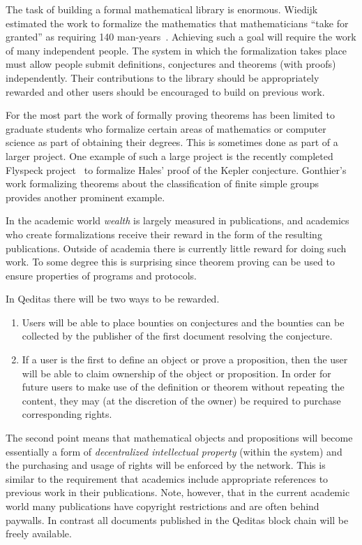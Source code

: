 \documentclass{article}
\begin{document}
The task of building a formal mathematical library is enormous.
Wiedijk estimated the work to formalize the mathematics that mathematicians
``take for granted'' as requiring 140 man-years~\cite{WiedijkEstimating}.
Achieving such a goal will require the work of many independent people.
The system in which the formalization takes place must allow people
submit definitions, conjectures and theorems (with proofs)
independently. Their contributions to the library should be appropriately
rewarded and other users should be encouraged to build on previous work.

For the most part the work of formally proving theorems
has been limited to
graduate students who formalize certain areas of mathematics or computer science
as part of obtaining their degrees.
This is sometimes done as part of a larger project.
One example of such a large project is the recently completed Flyspeck project~\cite{Flyspeck2015}
to formalize Hales' proof of the Kepler conjecture.
Gonthier's work formalizing
theorems about the classification of finite simple groups~\cite{Gonthier2013}
provides another prominent example.

In the academic world {\em{wealth}} is largely measured in publications,
and academics who create formalizations
receive their reward in the form of the resulting publications.
Outside of academia there is currently little reward for doing such work.
To some degree this is surprising since theorem proving can
be used to ensure properties of programs and protocols.

In Qeditas there will be two ways to be rewarded.
\begin{enumerate}
\item Users will be able to place bounties on conjectures
and the bounties can be collected by the publisher
of the first document resolving the conjecture.
\item If a user is the first to define an object or prove a proposition,
then the user will be able to claim ownership of the object or proposition.
In order for future users to make use of the definition or theorem without repeating the
content,
they may (at the discretion of the owner) be required to purchase corresponding rights.
\end{enumerate}
The second point means that mathematical objects and propositions
will become essentially a form of {\em{decentralized intellectual property}}
(within the system) and the purchasing and usage of rights will be enforced by the network.
This is similar to the requirement that academics include appropriate references
to previous work in their publications.
Note, however, that in the current academic world many publications
have copyright restrictions and are often behind paywalls.
In contrast all documents published in the Qeditas block chain
will be freely available.
\end{document}
